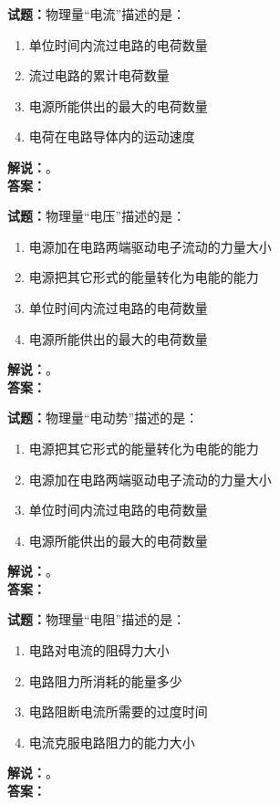\documentclass{ctexbook}
\begin{document}
\bigskip




\noindent\textbf{试题：}物理量“电流”描述的是：
\begin{enumerate}[leftmargin=3em]
\item 单位时间内流过电路的电荷数量
\item 流过电路的累计电荷数量
\item 电源所能供出的最大的电荷数量
\item 电荷在电路导体内的运动速度
\end{enumerate}
\noindent\textbf{解说：}\textbf{}。\\\noindent\textbf{答案：}

\bigskip




\noindent\textbf{试题：}物理量“电压”描述的是：
\begin{enumerate}[leftmargin=3em]
\item 电源加在电路两端驱动电子流动的力量大小
\item 电源把其它形式的能量转化为电能的能力
\item 单位时间内流过电路的电荷数量
\item 电源所能供出的最大的电荷数量
\end{enumerate}
\noindent\textbf{解说：}\textbf{}。\\\noindent\textbf{答案：}

\bigskip




\noindent\textbf{试题：}物理量“电动势”描述的是：
\begin{enumerate}[leftmargin=3em]
\item 电源把其它形式的能量转化为电能的能力
\item 电源加在电路两端驱动电子流动的力量大小
\item 单位时间内流过电路的电荷数量
\item 电源所能供出的最大的电荷数量
\end{enumerate}
\noindent\textbf{解说：}\textbf{}。\\\noindent\textbf{答案：}

\bigskip




\noindent\textbf{试题：}物理量“电阻”描述的是：
\begin{enumerate}[leftmargin=3em]
\item 电路对电流的阻碍力大小
\item 电路阻力所消耗的能量多少
\item 电路阻断电流所需要的过度时间
\item 电流克服电路阻力的能力大小
\end{enumerate}
\noindent\textbf{解说：}\textbf{}。\\\noindent\textbf{答案：}
\end{document}
